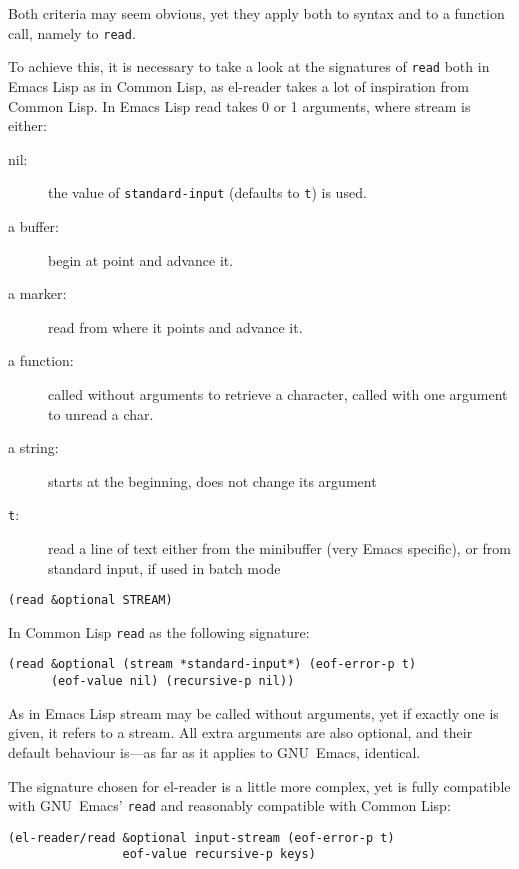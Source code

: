 \documentclass[a4paper,10pt,twoside]{article}
\newcommand{\el}{Emacs Lisp}
\newcommand{\cl}{Common Lisp}
\newcommand{\elr}{el-reader}
\newcommand{\sym}[1]{\texttt{#1}}
\newcommand{\fun}[1]{\texttt{#1}}
\newcommand{\emacs}{GNU~Emacs}
\newcommand{\Read}{\fun{read}}
\begin{document}
Both criteria may seem obvious, yet they apply both to syntax and to a function
call, namely to \Read{}.

To achieve this, it is necessary to take a look at the signatures of \Read{}
both in \el{} as in \cl{}, as \elr{} takes a lot of inspiration from \cl{}.  In
\el{} read takes 0 or 1 arguments, where stream is either:
\begin{description}
\item[nil:] the value of \sym{standard-input} (defaults to \sym{t}) is used.
\item[a buffer:] begin at point and advance it.
\item[a marker:] read from where it points and advance it.
\item[a function:] called without arguments to retrieve a character, called with
  one argument to unread a char.
\item[a string:] starts at the beginning, does not change its argument
\item[\sym{t}:] read a line of text either from the minibuffer (very Emacs
  specific), or from standard input, if used in batch mode
\end{description}

\begin{lstlisting}[style=lispinline]
(read &optional STREAM)
\end{lstlisting}

In \cl{} \Read{} as the following signature:

\begin{lstlisting}[style=lispinline]
(read &optional (stream *standard-input*) (eof-error-p t)
      (eof-value nil) (recursive-p nil))
\end{lstlisting}

As in \el{} stream may be called without arguments, yet if exactly one is given,
it refers to a stream.  All extra arguments are also optional, and their default
behaviour is---as far as it applies to \emacs{}, identical.

The signature chosen for \elr{} is a little more complex, yet is fully
compatible with \emacs{}’ \Read{} and reasonably compatible with \cl{}:

\begin{lstlisting}[style=lispinline]
(el-reader/read &optional input-stream (eof-error-p t)
                eof-value recursive-p keys)
\end{lstlisting}
\end{document}
